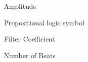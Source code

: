
Amplitude



\term{\hbox{\&}}Propositional logic symbol 



Filter Coefficient



\bigskip



Number of Beats